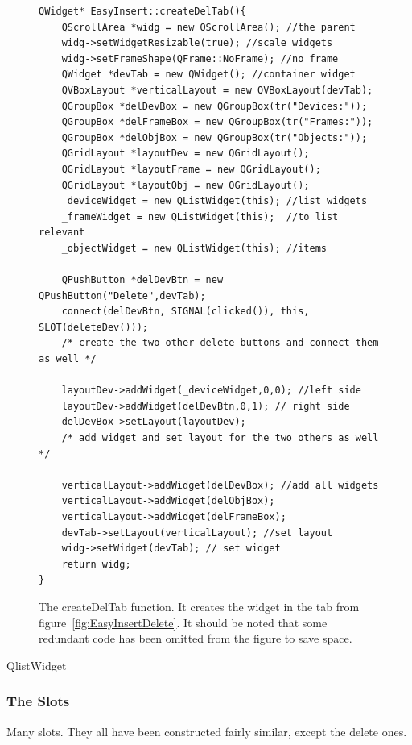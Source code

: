 \begin{figure}[h] %
\centering
\lstset{language=C++} 
\begin{lstlisting}[frame=single]  
QWidget* EasyInsert::createDelTab(){
	QScrollArea *widg = new QScrollArea(); //the parent
    widg->setWidgetResizable(true); //scale widgets
    widg->setFrameShape(QFrame::NoFrame); //no frame
    QWidget *devTab = new QWidget(); //container widget
    QVBoxLayout *verticalLayout = new QVBoxLayout(devTab);
    QGroupBox *delDevBox = new QGroupBox(tr("Devices:"));
    QGroupBox *delFrameBox = new QGroupBox(tr("Frames:"));
    QGroupBox *delObjBox = new QGroupBox(tr("Objects:"));
    QGridLayout *layoutDev = new QGridLayout();
    QGridLayout *layoutFrame = new QGridLayout();
    QGridLayout *layoutObj = new QGridLayout();
    _deviceWidget = new QListWidget(this); //list widgets 
    _frameWidget = new QListWidget(this);  //to list relevant
    _objectWidget = new QListWidget(this); //items

    QPushButton *delDevBtn = new QPushButton("Delete",devTab);
    connect(delDevBtn, SIGNAL(clicked()), this, SLOT(deleteDev()));
    /* create the two other delete buttons and connect them as well */

    layoutDev->addWidget(_deviceWidget,0,0); //left side
    layoutDev->addWidget(delDevBtn,0,1); // right side
    delDevBox->setLayout(layoutDev);
    /* add widget and set layout for the two others as well */

    verticalLayout->addWidget(delDevBox); //add all widgets
    verticalLayout->addWidget(delObjBox);
    verticalLayout->addWidget(delFrameBox);
    devTab->setLayout(verticalLayout); //set layout
    widg->setWidget(devTab); // set widget
    return widg;
}
\end{lstlisting}
\caption{The createDelTab function. It creates the widget in the tab from figure~\ref{fig:EasyInsertDelete}. It should be noted that some redundant code has been omitted from the figure to save space.}
\label{fig:delTabCode} 	
\end{figure}


QlistWidget


\subsubsection{The Slots}

Many slots. They all have been constructed fairly similar, except the delete ones.




